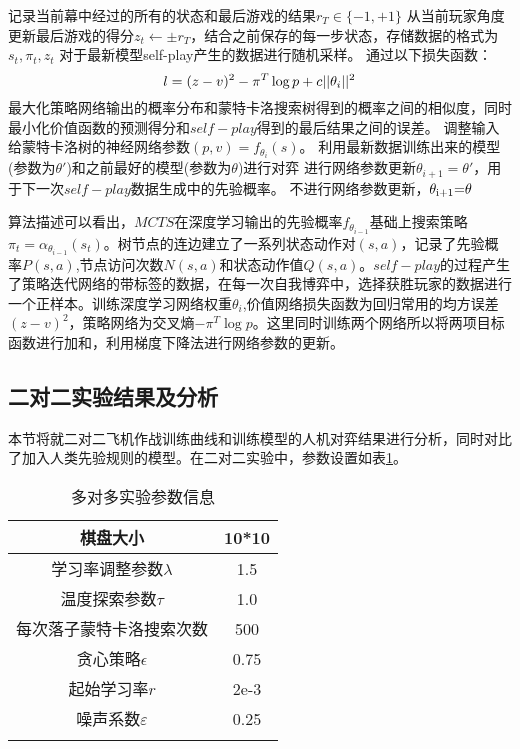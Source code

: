 		\begin{algorithm}[htbp]
		\begin{algorithmic}[1]
		\State 记录当前幕中经过的所有的状态和最后游戏的结果${r_T} \in \{  - 1, + 1\} $
		\State 从当前玩家角度更新最后游戏的得分${z_t} \leftarrow  \pm {r_T}$，结合之前保存的每一步状态，存储数据的格式为$s_t,\pi_t,z_t$
		\EndFor
		\State 对于最新模型self-play产生的数据进行随机采样。
		\State 通过以下损失函数：
		\begin{equation}
		l = {(z - v)^2} - {\pi ^T}\log p + c||{\theta _i}{\rm{|}}{{\rm{|}}^{\rm{2}}}
		\end{equation}
		最大化策略网络输出的概率分布和蒙特卡洛搜索树得到的概率之间的相似度，同时最小化价值函数的预测得分和$self-play$得到的最后结果之间的误差。
		调整输入给蒙特卡洛树的神经网络参数$(p,v) = {f_{{\theta _i}}}(s)$。
		\State 利用最新数据训练出来的模型(参数为$\theta '$)和之前最好的模型(参数为$\theta$)进行对弈
		 \State 进行网络参数更新${\theta _{i + 1}} = \theta '$，用于下一次$self-play$数据生成中的先验概率。
		\Else
		 \State 不进行网络参数更新，${\theta _{{\rm{i + 1}}}}{\rm{ = }}\theta $
		\EndIf
		\EndIf
		\EndFor
	\end{algorithmic}
\end{algorithm}

算法描述可以看出，$MCTS$在深度学习输出的先验概率${f_{{\theta _{i - 1}}}}$基础上搜索策略${\pi _t} = {\alpha _{{\theta _{i - 1}}}}({s_t})$。树节点的连边建立了一系列状态动作对$(s,a)$，记录了先验概率$P(s,a)$,节点访问次数$N(s,a)$和状态动作值$Q(s,a)$。$self-play$的过程产生了策略迭代网络的带标签的数据，在每一次自我博弈中，选择获胜玩家的数据进行一个正样本。训练深度学习网络权重${\theta _i}$,价值网络损失函数为回归常用的均方误差${(z - v)^2}$，策略网络为交叉熵$ - {\pi ^T}\log p$。这里同时训练两个网络所以将两项目标函数进行加和，利用梯度下降法进行网络参数的更新。

\subsection{二对二实验结果及分析}
本节将就二对二飞机作战训练曲线和训练模型的人机对弈结果进行分析，同时对比了加入人类先验规则的模型。在二对二实验中，参数设置如表\ref{erduiercanshu}。
\begin{table}[htbp]
	\centering
	\caption{多对多实验参数信息}
	\begin{tabular}{c|c}
		\hline 
		棋盘大小 & 10*10 \\ 
		\hline 
		学习率调整参数$\lambda$ & 1.5 \\ 
		\hline 
		温度探索参数$\tau$& 1.0 \\ 
		\hline 
		每次落子蒙特卡洛搜索次数 & 500 \\ 
		\hline 
		贪心策略$\epsilon$ & 0.75 \\ 
		\hline 
		起始学习率$r$ & 2e-3\\
		\hline 
		噪声系数$\varepsilon$ &0.25\\
		\hline
		\label{erduiercanshu}
	\end{tabular} 
\end{table}

